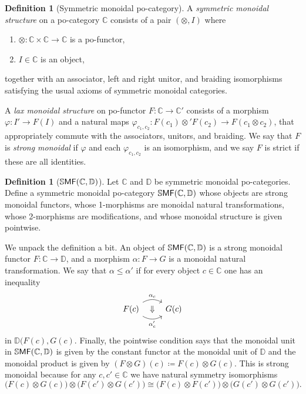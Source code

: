 \documentclass[11pt, oneside, article]{memoir}
\theoremstyle{plain}
\theoremstyle{definition}
\newtheorem{definition}[theorem]{Definition}
\theoremstyle{remark}
\newcommand{\Cat}[1]{{\mathsf{#1}}}%
\newcommand{\CCat}[1]{\mathbb{\StrLeft{#1}{1}}\Cat{\StrGobbleLeft{#1}{1}}}%
\newcommand{\ssmf}{\CCat{SMF}}
\newcommand{\cc}{\mathbb{C}}
\newcommand{\dd}{\mathbb{D}}
\begin{document}
\begin{definition}[Symmetric monoidal po-category]
A \emph{symmetric monoidal structure} on a po-category $\cc$ consists of a pair $(\otimes,I)$ where
\begin{enumerate}
	\item $\otimes\colon\cc\times\cc\to\cc$ is a po-functor,
	\item $I\in\cc$ is an object,
\end{enumerate}
together with an associator, left and right unitor, and braiding isomorphisms satisfying the usual axioms of symmetric monoidal categories.

A \emph{lax monoidal structure} on po-functor $F\colon\cc\to\cc'$ consists of a morphism  $\varphi\colon I'\to F(I)$ and a natural maps $\varphi_{c_1,c_2}\colon F(c_1)\otimes' F(c_2)\to F(c_1\otimes c_2)$, that appropriately commute with the associators, unitors, and braiding. We say that $F$ is \emph{strong monoidal} if $\varphi$ and each $\varphi_{c_1,c_2}$ is an isomorphism, and we say $F$ is strict if these are all identities.
\end{definition}

\begin{definition}[$\ssmf(\cc,\dd)$]\label{def.smf}
Let $\cc$ and $\dd$ be symmetric monoidal po-categories. Define a symmetric monoidal po-category $\ssmf(\cc,\dd)$ whose objects are strong monoidal functors, whose 1-morphisms are monoidal natural transformations, whose 2-morphisms are modifications, and whose monoidal structure is given pointwise.
\end{definition}
We unpack the definition a bit. An object of $\ssmf(\cc,\dd)$ is a strong monoidal functor $F\colon\cc\to\dd$, and a morphism $\alpha\colon F\to G$ is a monoidal natural transformation. We say that $\alpha\leq\alpha'$ if for every object $c\in\cc$ one has an inequality
\[
\begin{tikzcd}
	F(c)\ar[r, bend left, "\alpha_c"]\ar[r, bend right, "\alpha'_c"']\ar[r, phantom, "\Downarrow"]&
	G(c)
\end{tikzcd}
\]
in $\dd(F(c),G(c)$. Finally, the pointwise condition says that the monoidal unit in $\ssmf(\cc,\dd)$ is given by the constant functor at the monoidal unit of $\dd$ and the monoidal product is given by $(F\otimes G)(c)\coloneqq F(c)\otimes G(c).$ This is strong monoidal because for any $c,c'\in\cc$ we have natural symmetry isomorphisms
\[
	\big(F(c)\otimes G(c)\big)\otimes\big(F(c')\otimes G(c')\big)
	\cong
	\big(F(c)\otimes F(c')\big)\otimes\big(G(c')\otimes G(c')\big).
\]
\end{document}
